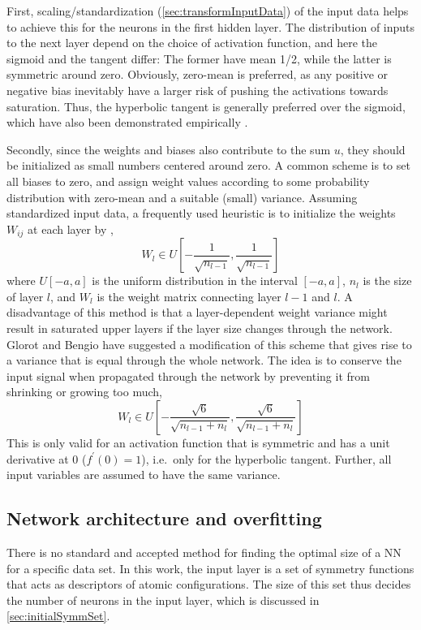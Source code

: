 \documentclass[twoside,english]{uiofysmaster}
\begin{document}
First, scaling/standardization (\autoref{sec:transformInputData}) of the input data helps to achieve this for
the neurons in the first hidden layer. The distribution of inputs to the next layer depend on the choice of activation function, and 
here the sigmoid and the tangent differ: The former have mean 1/2, while the latter is symmetric around zero. 
Obviously, zero-mean is preferred, as any positive or negative bias inevitably have a larger risk of pushing the activations 
towards saturation. Thus, the hyperbolic tangent is generally preferred over the sigmoid, which have also been demonstrated 
empirically \cite{Karlik11,Glorot10}. 

Secondly, since the weights and biases also contribute to the sum $u$, they should be initialized as small numbers centered around zero. 
A common scheme is to 
set all biases to zero, and assign weight values according to some probability distribution with zero-mean and 
a suitable (small) variance. Assuming standardized input data, 
a frequently used heuristic is to initialize the weights $W_{ij}$ at each layer by 
\cite{Bengio12,LeCun12},
\begin{equation}
 W_l \in U\left[-\frac{1}{\sqrt{n_{l-1}}}, \frac{1}{\sqrt{n_{l-1}}}\right]
\end{equation}
where $U[-a, a]$ is the uniform distribution in the interval $[-a,a]$, $n_l$ is the size of layer $l$, and 
$W_l$ is the weight matrix connecting layer $l-1$ and $l$. 
A disadvantage of this method is that a layer-dependent weight variance might result in saturated upper layers 
if the layer size changes through the network.  
Glorot and Bengio \cite{Glorot10} have suggested a modification of this scheme that gives rise to a variance that 
is equal through the whole network. The idea is to 
conserve the input signal when propagated through the network by preventing it from shrinking or growing too much,  
\begin{equation}
 W_l \in U\left[-\frac{\sqrt{6}}{\sqrt{n_{l-1}+n_{l}}}, \frac{\sqrt{6}}{\sqrt{n_{l-1}+n_{l}}}  \right]
\end{equation}
This is only valid for an activation function that is symmetric and has a unit derivative at 0 ($f^\prime(0) = 1$), i.e.\ only 
for the hyperbolic tangent. Further, all input variables are assumed to have the same variance.




\subsection{Network architecture and overfitting} \label{sec:overfitting}
There is no standard and accepted method for finding the optimal size of a NN for a specific data set. 
In this work, the input layer is a set of symmetry functions that acts as descriptors of atomic configurations.
The size of this set thus decides the number of neurons in the input layer, which is discussed in \autoref{sec:initialSymmSet}. 
\end{document}
